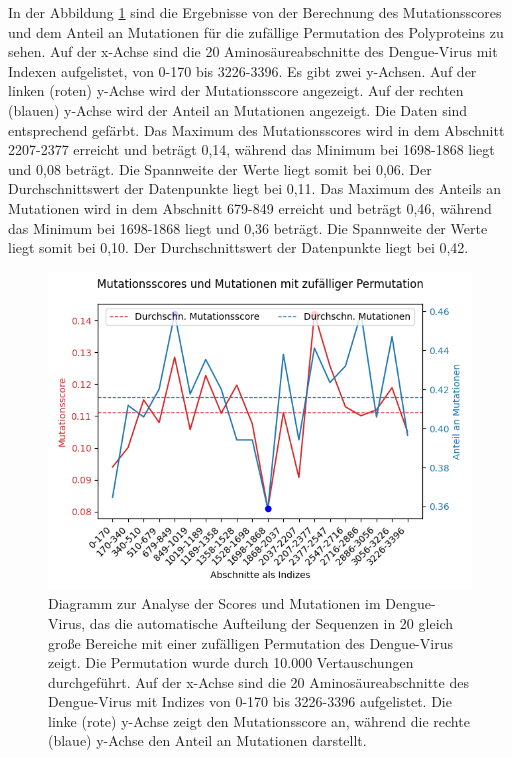 \documentclass[german,version-2022-01]{uzl-thesis}
\begin{document}
In der Abbildung \ref{fig:Dengue_virus_scores_and_mutations_bereiche_random} sind die Ergebnisse von der Berechnung des Mutationsscores und dem Anteil an Mutationen f\"ur die zuf\"allige Permutation des Polyproteins zu sehen. Auf der x-Achse sind die 20 Aminos\"aureabschnitte des Dengue-Virus mit Indexen aufgelistet, von 0-170 bis 3226-3396. Es gibt zwei y-Achsen. Auf der linken (roten) y-Achse wird der Mutationsscore angezeigt. Auf der rechten (blauen) y-Achse wird der Anteil an Mutationen angezeigt. Die Daten sind entsprechend gef\"arbt. Das Maximum des Mutationsscores wird in dem Abschnitt 2207-2377 erreicht und betr\"agt 0,14, w\"ahrend das Minimum bei 1698-1868 liegt und 0,08 betr\"agt. Die Spannweite der Werte liegt somit bei 0,06. Der Durchschnittswert der Datenpunkte liegt bei 0,11. Das Maximum des Anteils an Mutationen wird in dem Abschnitt 679-849 erreicht und betr\"agt 0,46, w\"ahrend das Minimum bei 1698-1868 liegt und 0,36 betr\"agt. Die Spannweite der Werte liegt somit bei 0,10. Der Durchschnittswert der Datenpunkte liegt bei 0,42.
\begin{figure}[tbp]
  \centering
  \includegraphics[scale=0.65]{Images/Diagramm_Scores_und_Mutationen_Dengue_viren_Bereiche_random.png}
  \caption{Diagramm zur Analyse der Scores und Mutationen im Dengue-Virus, das die automatische Aufteilung der Sequenzen in 20 gleich gro\ss{}e Bereiche mit einer zuf\"alligen Permutation des Dengue-Virus zeigt. Die Permutation wurde durch 10.000 Vertauschungen durchgef\"uhrt. Auf der x-Achse sind die 20 Aminos\"aureabschnitte des Dengue-Virus mit Indizes von 0-170 bis 3226-3396 aufgelistet. Die linke (rote) y-Achse zeigt den Mutationsscore an, w\"ahrend die rechte (blaue) y-Achse den Anteil an Mutationen darstellt.}
  \label{fig:Dengue_virus_scores_and_mutations_bereiche_random}
\end{figure}
\end{document}
